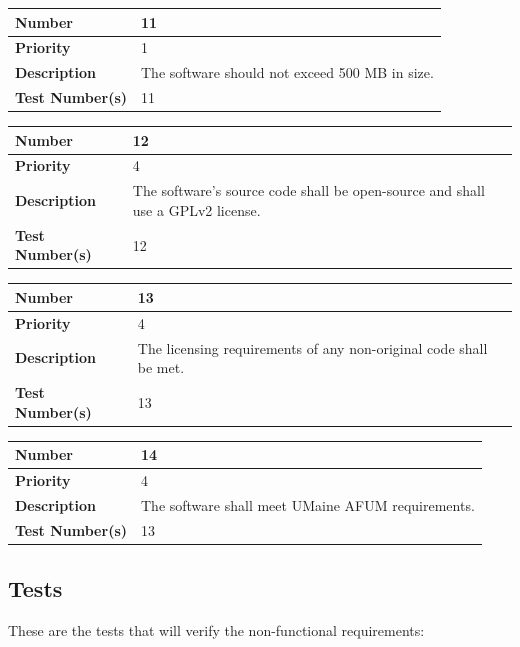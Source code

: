 \documentclass{article}
\begin{document}
\begin{center}
\bigskip
{}
\begin{tabular}{|p{3.5cm}|p{7.5cm}|} 
\hline
\textbf{Number} & 11  \\
\hline
\textbf{Priority} & 1 \\ 
\hline
\textbf{Description} & The software should not exceed 500 MB in size. \\ 
\hline
\textbf{Test Number(s) }& 11 \\ 
\hline
\end{tabular}


\bigskip
{}
\begin{tabular}{|p{3.5cm}|p{7.5cm}|} 
\hline
\textbf{Number} & 12  \\
\hline
\textbf{Priority} & 4\\ 
\hline
\textbf{Description} & The software's source code shall be open-source and shall use a GPLv2 license. \\ 
\hline
\textbf{Test Number(s) }& 12\\ 
\hline
\end{tabular}


\bigskip
{}
\begin{tabular}{|p{3.5cm}|p{7.5cm}|} 
\hline
\textbf{Number} & 13  \\
\hline
\textbf{Priority} & 4 \\ 
\hline
\textbf{Description} & The licensing requirements of any non-original code shall be met.\\ 
\hline
\textbf{Test Number(s) }& 13 \\ 
\hline
\end{tabular}

\bigskip
{}
\begin{tabular}{|p{3.5cm}|p{7.5cm}|} 
\hline
\textbf{Number} & 14  \\
\hline
\textbf{Priority} & 4 \\ 
\hline
\textbf{Description} & The software shall meet UMaine AFUM requirements.\\ 
\hline
\textbf{Test Number(s) }& 13 \\ 
\hline
\end{tabular}

\end{center}

\subsection{Tests}

These are the tests that will verify the non-functional requirements:
\end{document}
